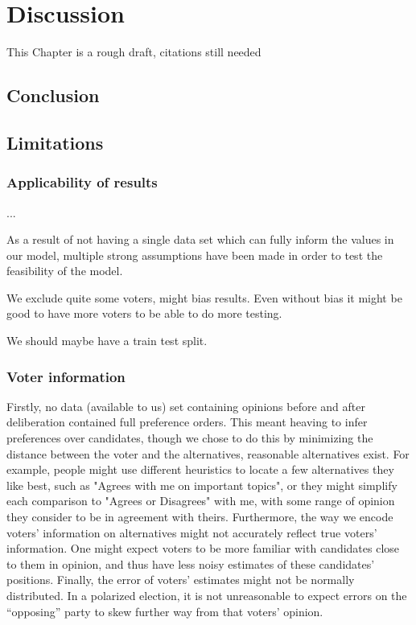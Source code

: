 \newpage
\chapter{Discussion}
\label{Discussion}


\textcolor{RedOrange}{This Chapter is a rough draft, citations still needed}
\section{Conclusion}



\section{Limitations}

\subsection{Applicability of results}
...


As a result of not having a single data set which can fully inform the values
in our model, multiple strong assumptions have been made in order to test the
feasibility of the model.


We exclude quite some voters, might bias results. Even without bias it might be good to have more voters to be able to do more testing.

We should maybe have a train test split.

\subsection{Voter information}

Firstly, no data (available to us) set containing opinions before and after
deliberation contained full preference orders. This meant heaving to infer
preferences over candidates, though we chose to do this by minimizing the
distance between the voter and the alternatives, reasonable alternatives exist.
For example, people might use different heuristics to locate a few alternatives
they like best, such as "Agrees with me on important topics", or they might
simplify each comparison to "Agrees or Disagrees" with me, with some range of
opinion they consider to be in agreement with theirs. Furthermore, the way we
encode voters' information on alternatives might not accurately reflect true
voters' information. One might expect voters to be more familiar with
candidates close to them in opinion, and thus have less noisy estimates of
these candidates' positions. Finally,  the error of voters' estimates might not
be normally distributed. In a polarized election, it is not unreasonable to
expect errors on the ``opposing'' party to skew further way from that voters'
opinion.


